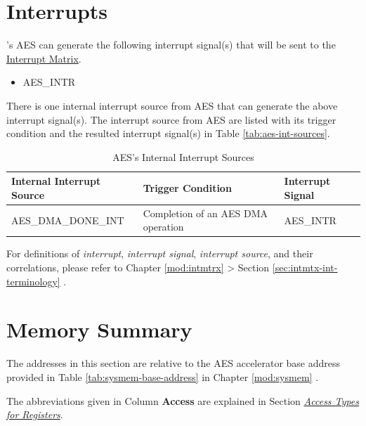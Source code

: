 \documentclass[main\_\_EN.tex]{subfiles}
\begin{document}

\section{Interrupts}


\chipname{}'s AES can generate the following interrupt signal(s) that will be sent to the \hyperref[mod:intmtrx]{Interrupt Matrix}.

    \begin{itemize}
        \item AES\_INTR
    \end{itemize}

There is one internal interrupt source from AES that can generate the above interrupt signal(s). The interrupt source from AES are listed with its trigger condition and the resulted interrupt signal(s) in Table \ref{tab:aes-int-sources}.

\begin{longtable}{ | L{5cm} | L{6.5cm} | L{4cm} | }
\caption{AES's Internal Interrupt Sources} \label{tab:aes-int-sources}
\\ \hline
{}
\textbf{Internal Interrupt Source} & \textbf{Trigger Condition}  &  \textbf{Interrupt Signal}\\ \hline
\label{int:AESDMADONEINT}AES\_DMA\_DONE\_INT  &  Completion of an AES DMA operation &  AES\_INTR  \\ \hline
\end{longtable}

\begin{tiplisting}
For definitions of \textit{interrupt}, \textit{interrupt signal}, \textit{interrupt source}, and their correlations, please refer to Chapter \ref{mod:intmtrx} \textit{} > Section \ref{sec:intmtx-int-terminology} \textit{}.
\end{tiplisting}


\section{Memory Summary}\label{aesMemorySummary}

The addresses in this section are relative to the AES accelerator base address provided in Table \ref{tab:sysmem-base-address} in Chapter \ref{mod:sysmem} \textit{}.

The abbreviations given in Column \textbf{Access} are explained in Section \hyperref[glossary-access-types]{\textit{Access Types for Registers}}.
\end{document}
